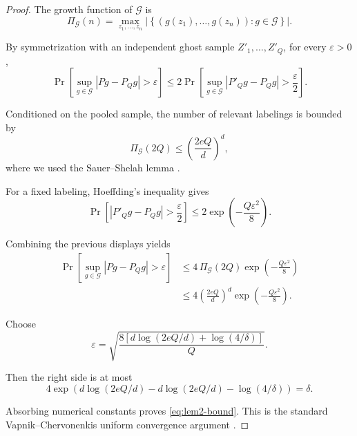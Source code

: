 \documentclass{article} %
\begin{document}
\begin{proof}
The growth function of \(\mathcal G\) is
\begin{equation}
\label{eq:pf1-growth}
\Pi_{\mathcal G}(n)
=
\max_{z_1,\ldots,z_n}
\left|
\left\{
(g(z_1),\ldots,g(z_n)): g\in\mathcal G
\right\}
\right|.
\end{equation}

By symmetrization with an independent ghost sample
\(Z'_1,\ldots,Z'_Q\), for every \(\varepsilon>0\),
\begin{equation}
\label{eq:pf1-a}
\Pr\!\left[
\sup_{g\in\mathcal G}|Pg-P_Qg|>\varepsilon
\right]
\le
2\Pr\!\left[
\sup_{g\in\mathcal G}|P'_Qg-P_Qg|>\frac{\varepsilon}{2}
\right].
\end{equation}

Conditioned on the pooled sample, the number of relevant labelings is bounded by
\begin{equation}
\label{eq:pf1-sauer}
\Pi_{\mathcal G}(2Q)
\le
\left(\frac{2eQ}{d}\right)^d,
\end{equation}
where we used the Sauer--Shelah lemma
\cite{sauer1972density,shelah1972combinatorial}.

For a fixed labeling, Hoeffding's inequality gives
\begin{equation}
\label{eq:pf1-hoeffding}
\Pr\!\left[
|P'_Qg-P_Qg|>\frac{\varepsilon}{2}
\right]
\le
2\exp\!\left(-\frac{Q\varepsilon^2}{8}\right).
\end{equation}

Combining the previous displays yields
\begin{align}
\Pr\!\left[
\sup_{g\in\mathcal G}|Pg-P_Qg|>\varepsilon
\right]
&\le
4\,\Pi_{\mathcal G}(2Q)
\exp\!\left(-\frac{Q\varepsilon^2}{8}\right)
\label{eq:pf1-b}
\\
&\le
4
\left(\frac{2eQ}{d}\right)^d
\exp\!\left(-\frac{Q\varepsilon^2}{8}\right).
\label{eq:pf1-c}
\end{align}

Choose
\begin{equation}
\label{eq:pf1-epsilon}
\varepsilon
=
\sqrt{
\frac{
8\left[d\log(2eQ/d)+\log(4/\delta)\right]
}{Q}
}.
\end{equation}

Then the right side is at most
\begin{equation}
\label{eq:pf1-d}
4
\exp\!\left(
d\log(2eQ/d)
-
d\log(2eQ/d)
-
\log(4/\delta)
\right)
=
\delta .
\end{equation}

Absorbing numerical constants proves \eqref{eq:lem2-bound}. This is the
standard Vapnik--Chervonenkis uniform convergence argument
\cite{vapnik1971uniform}.
\end{proof}
\end{document}
